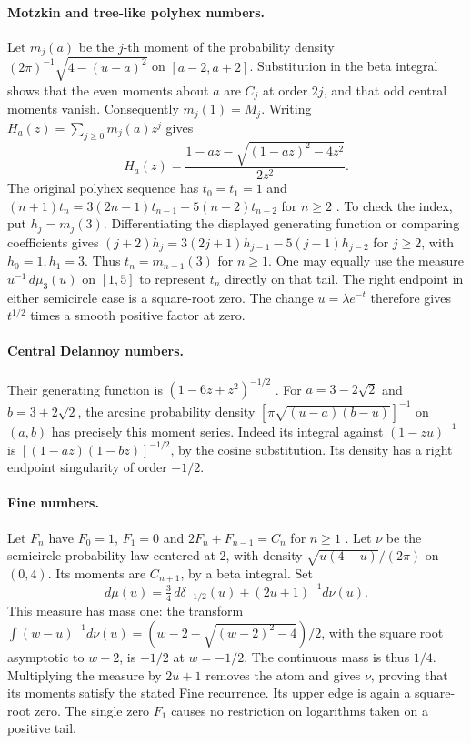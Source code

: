 \documentclass[11pt,a4paper]{article}
\begin{document}
\paragraph{Motzkin and tree-like polyhex numbers.}
Let $m_j(a)$ be the $j$-th moment of the probability density
$(2\pi)^{-1}\sqrt{4-(u-a)^2}$ on $[a-2,a+2]$. Substitution in the beta integral shows that
the even moments about $a$ are $C_j$ at order $2j$, and that odd central moments vanish.
Consequently $m_j(1)=M_j$. Writing $H_a(z)=\sum_{j\ge0}m_j(a)z^j$ gives
\[
 H_a(z)=\frac{1-az-\sqrt{(1-az)^2-4z^2}}{2z^2}.
\]
The original polyhex sequence has $t_0=t_1=1$ and
$(n+1)t_n=3(2n-1)t_{n-1}-5(n-2)t_{n-2}$ for $n\ge2$
\cite[Sec.~4]{cgw}. To check the index, put $h_j=m_j(3)$. Differentiating
the displayed generating function or comparing coefficients gives
$(j+2)h_j=3(2j+1)h_{j-1}-5(j-1)h_{j-2}$ for $j\ge2$, with
$h_0=1,h_1=3$. Thus $t_n=m_{n-1}(3)$ for $n\ge1$. One may equally use
the measure $u^{-1}\,d\mu_3(u)$ on $[1,5]$ to represent $t_n$ directly
on that tail. The right endpoint in either semicircle case is a square-root
zero. The change $u=\lambda e^{-t}$ therefore gives $t^{1/2}$ times a
smooth positive factor at zero.

\paragraph{Central Delannoy numbers.}
Their generating function is $(1-6z+z^2)^{-1/2}$ \cite{cgw}.
For $a=3-2\sqrt2$ and $b=3+2\sqrt2$, the arcsine probability
density $[\pi\sqrt{(u-a)(b-u)}]^{-1}$ on $(a,b)$ has precisely this
moment series. Indeed its integral against $(1-zu)^{-1}$ is
$[(1-az)(1-bz)]^{-1/2}$, by the cosine substitution. Its density has a
right endpoint singularity of order $-1/2$.

\paragraph{Fine numbers.}
Let $F_n$ have $F_0=1$, $F_1=0$ and $2F_n+F_{n-1}=C_n$ for $n\ge1$
\cite{fine}. Let $\nu$ be the semicircle probability law centered at $2$,
with density $\sqrt{u(4-u)}/(2\pi)$ on $(0,4)$. Its moments are
$C_{n+1}$, by a beta integral. Set
\[
 d\mu(u)=\tfrac34\,d\delta_{-1/2}(u)+(2u+1)^{-1}d\nu(u).
\]
This measure has mass one: the transform
$\int(w-u)^{-1}d\nu(u)=(w-2-\sqrt{(w-2)^2-4})/2$,
with the square root asymptotic to $w-2$, is $-1/2$ at $w=-1/2$.
The continuous mass is thus $1/4$. Multiplying the measure by $2u+1$
removes the atom and gives $\nu$, proving that its moments satisfy the
stated Fine recurrence. Its upper edge is again a square-root zero.
The single zero $F_1$ causes no restriction on logarithms taken on a
positive tail.
\end{document}
